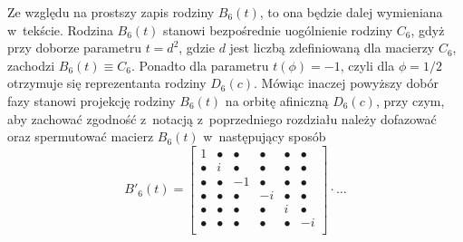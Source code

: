 \documentclass[a4paper,12pt,twoside]{article}
\begin{document}
Ze wzgl\k{e}du na prostszy zapis rodziny $B_6(t)$, to ona b\k{e}dzie dalej wymieniana w~tek\'{s}cie. Rodzina $B_6(t)$ stanowi bezpo\'{s}rednie uog\'{o}lnienie rodziny $C_6$, gdy\.{z} przy doborze pa\-ra\-met\-ru $t=d^2$, gdzie $d$ jest liczb\k{a} zdefiniowan\k{a} dla macierzy $C_6$, zachodzi $B_6(t) \equiv C_6$. Ponadto dla parametru $t(\phi)=-1$, czyli dla $\phi=1/2$ otrzymuje si\k{e} reprezentanta rodziny $D_6(c)$. M\'{o}wi\k{a}c inaczej powy\.{z}szy dob\'{o}r fazy stanowi projekcj\k{e} rodziny $B_6(t)$ na orbit\k{e} afiniczn\k{a} $D_6(c)$, przy czym, aby zachowa\'{c} zgodno\'{s}\'{c} z~notacj\k{a} z~poprzedniego rozdzia{\l}u nale\.{z}y dofazowa\'{c} oraz spermutowa\'{c} macierz $B_6(t)$ w~nast\k{e}puj\k{a}cy spos\'{o}b
\begin{equation}
B'_6(t) =
\left[
\begin{array}{cccccc}
      1 & \bullet & \bullet & \bullet & \bullet & \bullet\\
\bullet &       i & \bullet & \bullet & \bullet & \bullet\\
\bullet & \bullet &      -1 & \bullet & \bullet & \bullet\\
\bullet & \bullet & \bullet &      -i & \bullet & \bullet\\
\bullet & \bullet & \bullet & \bullet &       i & \bullet\\
\bullet & \bullet & \bullet & \bullet & \bullet &      -i\\
\end{array}
\right]\cdot \dots
\end{equation}
\end{document}
